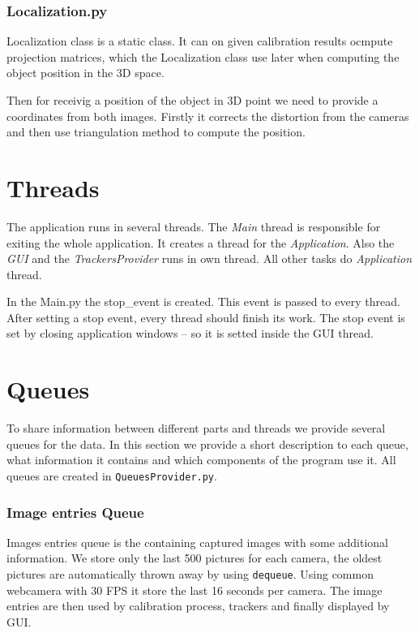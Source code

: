 \subsubsection*{Localization.py}

Localization class is a static class. It can on given calibration results
ocmpute projection matrices, which the Localization class use later when
computing the object position in the 3D space.

Then for receivig a position of the object in 3D point we need to provide a
coordinates from both images. Firstly it corrects the distortion from the
cameras and then use triangulation method to compute the position.

\section{Threads}

The application runs in several threads. The \emph{Main} thread is responsible
for exiting the whole application. It creates a thread for the
\emph{Application}. Also the \emph{GUI} and the \emph{TrackersProvider}
runs in own thread. All other tasks do \emph{Application} thread.

In the Main.py the stop\_event is created. This event is passed to every thread.
After setting a stop event, every thread should finish its work. The stop event
is set by closing application windows -- so it is setted inside the GUI thread.

\section{Queues}

To share information between different parts and threads we provide several
queues for the data. In this section we provide a short description to each
queue, what information it contains and which components of the program use it.
All queues are created in \verb+QueuesProvider.py+. 

\subsubsection{Image entries Queue}

Images entries queue is the containing captured images with some additional
information. We store only the last 500 pictures for each camera, the oldest
pictures are automatically thrown away by using \verb+dequeue+. Using common
webcamera with 30 FPS it store the last 16 seconds per camera. The image
entries are then used by calibration process, trackers and finally displayed by
GUI.

